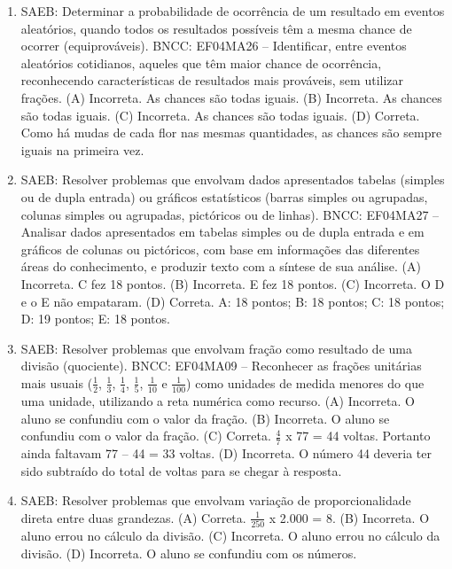 \begin{enumerate}
\item
SAEB: Determinar a probabilidade de ocorrência de um
resultado em eventos aleatórios, quando todos os resultados possíveis
têm a mesma chance de ocorrer (equiprováveis).
BNCC: EF04MA26 -- Identificar, entre eventos aleatórios cotidianos, aqueles que têm maior chance de
ocorrência, reconhecendo características de resultados mais prováveis, sem utilizar frações.
(A) Incorreta. As chances são todas iguais.
(B) Incorreta. As chances são todas iguais.
(C) Incorreta. As chances são todas iguais.
(D) Correta. Como há mudas de cada flor nas mesmas quantidades, as chances são sempre iguais na primeira vez.

\item
SAEB: Resolver problemas que envolvam dados apresentados tabelas (simples ou
de dupla entrada) ou gráficos estatísticos (barras simples ou agrupadas,
colunas simples ou agrupadas, pictóricos ou de linhas).
BNCC: EF04MA27 -- Analisar dados apresentados em tabelas simples ou de dupla entrada e em gráficos de
colunas ou pictóricos, com base em informações das diferentes áreas do conhecimento, e produzir
texto com a síntese de sua análise.
(A) Incorreta. C fez 18 pontos.
(B) Incorreta. E fez 18 pontos.
(C) Incorreta. O D e o E não empataram.
(D) Correta. A: 18 pontos; B: 18 pontos; C: 18 pontos; D: 19 pontos; E: 18 pontos.


\item
SAEB: Resolver problemas que envolvam fração como resultado
de uma divisão (quociente).
BNCC: EF04MA09 -- Reconhecer as frações unitárias mais usuais ($\frac{1}{2}$, $\frac{1}{3}$, $\frac{1}{4}$, $\frac{1}{5}$, $\frac{1}{10}$ e $\frac{1}{100}$) como
unidades de medida menores do que uma unidade, utilizando a reta numérica como recurso.
(A) Incorreta. O aluno se confundiu com o valor da fração.
(B) Incorreta. O aluno se confundiu com o valor da fração.
(C) Correta. $\frac{4}{7}$ x 77 = 44 voltas. Portanto ainda faltavam 77 -- 44 = 33 voltas.
(D) Incorreta. O número 44 deveria ter sido subtraído do total de voltas para se chegar à resposta.

\item
SAEB: Resolver problemas que envolvam variação de proporcionalidade direta entre duas grandezas.
(A) Correta. $\frac{1}{250}$ x 2.000 = 8.
(B) Incorreta. O aluno errou no cálculo da divisão.
(C) Incorreta. O aluno errou no cálculo da divisão.
(D) Incorreta. O aluno se confundiu com os números.


\end{enumerate}
